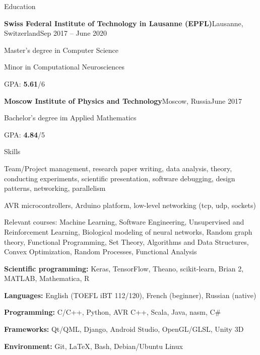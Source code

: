 \documentclass{resume} %
\begin{document}
\begin{rSection}{Education}
\hspace{-1em}
\begin{rSubsection}{\bf Swiss Federal Institute of Technology in Lausanne (EPFL)}{}{Lausanne, Switzerland}{Sep 2017 -- June 2020}
\item Master's degree in Computer Science
\item Minor in Computational Neurosciences
\item GPA: {\bf 5.61}/6
\end{rSubsection}

\begin{rSubsection}{\bf Moscow Institute of Physics and Technology}{}{Moscow, Russia}{June 2017}
\item Bachelor's degree im Applied Mathematics
\item GPA: {\bf 4.84}/5
\end{rSubsection}
\end{rSection}

\begin{rSection}{Skills}
	\item Team/Project management, research paper writing, data analysis, theory, conducting experiments, scientific presentation, software debugging, design patterns, networking, parallelism
	\item AVR microcontrollers, Arduino platform, low-level networking (tcp, udp, sockets)
	\item {\small Relevant courses: Machine Learning, Software Engineering, Unsupervised and Reinforcement Learning, Biological modeling of neural networks, Random graph theory, Functional Programming, Set Theory, Algorithms and Data Structures, Convex Optimization, Random Processes, Functional Analysis}
	\item {\bf Scientific programming:} Keras, TensorFlow, Theano, scikit-learn, Brian 2, MATLAB, Mathematica, R
	\item {\bf Languages:} English (TOEFL iBT 112/120), French (beginner), Russian (native)
	\item {\bf Programming:} C/C++, Python, AVR C++, Scala, Java, nasm, C\#
	\item {\bf Frameworks:} Qt/QML, Django, Android Studio, OpenGL/GLSL, Unity 3D
	\item {\bf Environment:} Git, \LaTeX, Bash, Debian/Ubuntu Linux
\end{rSection}
\end{document}
